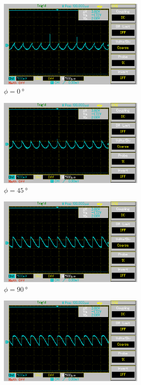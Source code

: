 \begin{figure}[H]%
    \begin{subfigure}{0.5\textwidth}%
    \centering%
    \includegraphics[width = 7.3cm]{./Oszilloskop Bilder/png/5.2/1 MAP002.png}%
    \caption{$\phi = \qty[]{0}{\degree}$}%
    \label{fig:phase1}%
    \end{subfigure}%
    \hfill%
    \begin{subfigure}{0.5\textwidth}%
    \centering%
    \includegraphics[width = 7.3cm]{./Oszilloskop Bilder/png/5.2/2 MAP003.png}%
    \caption{$\phi = \qty[]{45}{\degree}$}%
    \label{fig:phase2}%
    \end{subfigure}%
    \hfill
    \begin{subfigure}{0.5\textwidth}%
    \centering%
    \includegraphics[width = 7.3cm]{./Oszilloskop Bilder/png/5.2/3 MAP004.png}%
    \caption{$\phi = \qty[]{90}{\degree}$}%
    \label{fig:phase3}%
    \end{subfigure}%
    \hfill%
    \begin{subfigure}{0.5\textwidth}%
    \centering%
    \includegraphics[width = 7.3cm]{./Oszilloskop Bilder/png/5.2/4 MAP005.png}%

\end{subfigure}
\end{figure}
